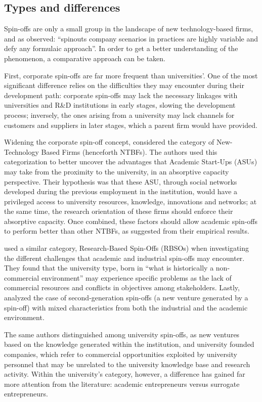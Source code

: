 \subsection{Types and differences}

Spin-offs are only a small group in the landscape of new technology-based firms, and as \citet{Franklin2001} observed: \enquote{spinouts company scenarios in practices are highly variable and defy any formulaic approach}. In order to get a better understanding of the phenomenon, a comparative approach can be taken.

First, corporate spin-offs are far more frequent than universities'. One of the most significant difference relies on the difficulties they may encounter during their development path: corporate spin-offs may lack the necessary linkages with universities and R\&D institutions in early stages, slowing the development process; inversely, the ones arising from a university may lack channels for customers and suppliers in later stages, which a parent firm would have provided.

Widening the corporate spin-off concept, \citet{Colombo2010} considered the category of New-Technology Based Firms (henceforth NTBFs). The authors used this categorization to better uncover the advantages that Academic Start-Ups (ASUs) may take from the proximity to the university, in an absorptive capacity perspective. Their hypothesis was that these ASU, through social networks developed during the previous employment in the institution, would have a privileged access to university resources, knowledge, innovations and networks; at the same time, the research orientation of these firms should enforce their absorptive capacity. Once combined, these factors should allow academic spin-offs to perform better than other NTBFs, as suggested from their empirical results.

\citet{Mustar2006} used a similar category, Research-Based Spin-Offs (RBSOs) when investigating the different challenges that academic and industrial spin-offs may encounter. They found that the university type, born in \enquote{what is historically a non-commercial environment} may experience specific problems as the lack of commercial resources and conflicts in objectives among stakeholders. Lastly, \citet{Leitch2005} analyzed the case of  second-generation spin-offs (a new venture generated by a spin-off) with mixed characteristics from both the industrial and the academic environment.

The same authors distinguished among university spin-offs, as new ventures based on the knowledge generated within the institution, and university founded companies, which refer to commercial opportunities exploited by university personnel that may be unrelated to the university knowledge base and research activity. Within the university's category, however, a difference has gained far more attention from the literature: academic entrepreneurs versus surrogate entrepreneurs.

